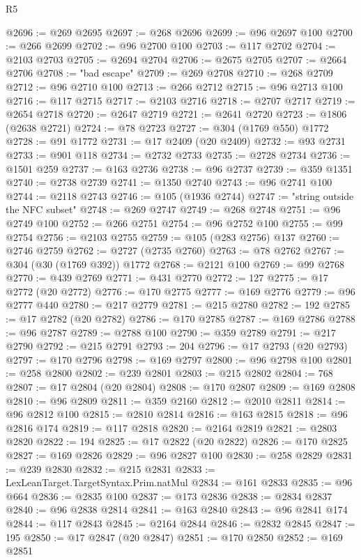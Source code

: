 \begin{lexlean}{R5}
\begin{coremodule}
@2696 := @269 @2695
@2697 := @268 @2696
@2699 := @96 @2697 @100
@2700 := @266 @2699
@2702 := @96 @2700 @100
@2703 := @117 @2702
@2704 := @2103 @2703
@2705 := @2694 @2704
@2706 := @2675 @2705
@2707 := @2664 @2706
@2708 := "bad escape"
@2709 := @269 @2708
@2710 := @268 @2709
@2712 := @96 @2710 @100
@2713 := @266 @2712
@2715 := @96 @2713 @100
@2716 := @117 @2715
@2717 := @2103 @2716
@2718 := @2707 @2717
@2719 := @2654 @2718
@2720 := @2647 @2719
@2721 := @2641 @2720
@2723 := @1806 (@2638 @2721)
@2724 := @78 @2723
@2727 := @304 (@1769 @550) @1772
@2728 := @91 @1772
@2731 := @17 @2409 (@20 @2409)
@2732 := @93 @2731
@2733 := @901 @118
@2734 := @2732 @2733
@2735 := @2728 @2734
@2736 := @1501 @259
@2737 := @163 @2736
@2738 := @96 @2737
@2739 := @359 @1351
@2740 := @2738 @2739
@2741 := @1350 @2740
@2743 := @96 @2741 @100
@2744 := @2118 @2743
@2746 := @105 (@1936 @2744)
@2747 := "string outside the NFC subset"
@2748 := @269 @2747
@2749 := @268 @2748
@2751 := @96 @2749 @100
@2752 := @266 @2751
@2754 := @96 @2752 @100
@2755 := @99 @2754
@2756 := @2103 @2755
@2759 := @105 (@283 @2756) @137
@2760 := @2746 @2759
@2762 := @2727 (@2735 @2760)
@2763 := @78 @2762
@2767 := @304 (@30 (@1769 @392)) @1772
@2768 := @2121 @100
@2769 := @99 @2768
@2770 := @439 @2769
@2771 := @431 @2770
@2772 := 127
@2775 := @17 @2772 (@20 @2772)
@2776 := @170 @2775
@2777 := @169 @2776
@2779 := @96 @2777 @440
@2780 := @217 @2779
@2781 := @215 @2780
@2782 := 192
@2785 := @17 @2782 (@20 @2782)
@2786 := @170 @2785
@2787 := @169 @2786
@2788 := @96 @2787
@2789 := @2788 @100
@2790 := @359 @2789
@2791 := @217 @2790
@2792 := @215 @2791
@2793 := 204
@2796 := @17 @2793 (@20 @2793)
@2797 := @170 @2796
@2798 := @169 @2797
@2800 := @96 @2798 @100
@2801 := @258 @2800
@2802 := @239 @2801
@2803 := @215 @2802
@2804 := 768
@2807 := @17 @2804 (@20 @2804)
@2808 := @170 @2807
@2809 := @169 @2808
@2810 := @96 @2809
@2811 := @359 @2160
@2812 := @2010 @2811
@2814 := @96 @2812 @100
@2815 := @2810 @2814
@2816 := @163 @2815
@2818 := @96 @2816 @174
@2819 := @117 @2818
@2820 := @2164 @2819
@2821 := @2803 @2820
@2822 := 194
@2825 := @17 @2822 (@20 @2822)
@2826 := @170 @2825
@2827 := @169 @2826
@2829 := @96 @2827 @100
@2830 := @258 @2829
@2831 := @239 @2830
@2832 := @215 @2831
@2833 := LexLeanTarget.TargetSyntax.Prim.natMul
@2834 := @161 @2833
@2835 := @96 @664
@2836 := @2835 @100
@2837 := @173 @2836
@2838 := @2834 @2837
@2840 := @96 @2838 @2814
@2841 := @163 @2840
@2843 := @96 @2841 @174
@2844 := @117 @2843
@2845 := @2164 @2844
@2846 := @2832 @2845
@2847 := 195
@2850 := @17 @2847 (@20 @2847)
@2851 := @170 @2850
@2852 := @169 @2851

\end{coremodule}
\end{lexlean}
